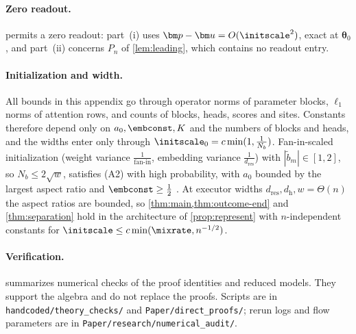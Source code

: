 \paragraph{Zero readout.}\label{rem:zero-readout}  permits a zero readout: part~(i) uses $\bm p-\bm u=O(\initscale^2)$, exact at $\bm\theta_0$, and part~(ii) concerns $P_n$ of
\cref{lem:leading}, which contains no readout entry.




\paragraph{Initialization and width.}
\label{rem:end-width}
All bounds in this appendix go through operator norms of parameter blocks, $\ell_1$ norms of attention rows, and counts of blocks,
heads, scores and sites. Constants therefore depend only on $a_0,\embconst,K$ and the numbers of blocks and heads, and the widths enter only
through $\initscale_0=c\min(1,\frac{1}{N_b})$. Fan-in-scaled initialization (weight variance $\frac{1}{\text{fan-in}}$, embedding variance $\frac{1}{d_{\mathrm{res}}}$) with
$|\tilde b_m|\in[1,2]$, so $N_b\le2\sqrt w$, satisfies (A2) with high probability, with $a_0$ bounded by the largest aspect ratio and $\embconst\ge\frac{1}{2}$
\citep[Thms.~4.4.5, 4.6.1]{vershynin2018high}. At executor widths $d_{\mathrm{res}},d_{\mathrm h},w=\Theta(n)$ the aspect ratios are bounded, so
\cref{thm:main,thm:outcome-end} and \cref{thm:separation} hold in the architecture of \cref{prop:represent} with $n$-independent constants for
$\initscale\le c\min(\mixrate,n^{-1/2})$.


\paragraph{Verification.}\label{app:verify}
 summarizes numerical checks of the proof identities and
reduced models. They support the algebra and do not replace the proofs.
Scripts are in \nolinkurl{handcoded/theory_checks/} and
\nolinkurl{Paper/direct_proofs/}; rerun logs and flow parameters are in
\nolinkurl{Paper/research/numerical_audit/}.

